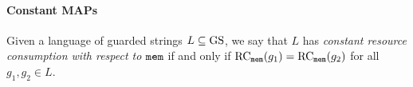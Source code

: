


\paragraph*{Constant MAPs}     
Given a language of guarded strings $L\subseteq \text{GS}$, we say that $L$ has \emph{constant resource consumption with respect to $\texttt{mem}$} if and only if $\text{RC}_{\texttt{mem}}(g_1)=\text{RC}_{\texttt{mem}}(g_2)$ for all $g_1, g_2 \in L$. 

